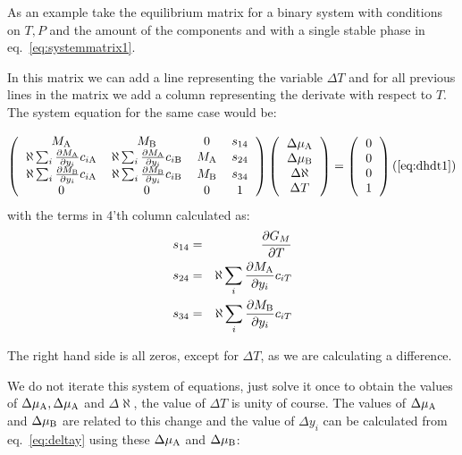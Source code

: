 \documentclass[12pt]{article}
\begin{document}
As an example take the equilibrium matrix for a binary system with
conditions on $T, P$ and the amount of the components and with a
single stable phase in eq.~\ref{eq:systemmatrix1}.

In this matrix we can add a line representing the variable $\Delta T$
and for all previous lines in the matrix we add a column representing
the derivate with respect to $T$.  The system equation for the same
case would be:

\label{eq:dhdt1}

\[
\left(
\begin{tabular}{cccc}
$M_{\rm A}$ & $M_{\rm B}$ & 0 & $s_{14}$ \\
$\aleph \sum_i \frac{\partial M_{\rm A}}{\partial y_i} c_{i{\rm A}}$ &
$\aleph \sum_i \frac{\partial M_{\rm A}}{\partial y_i} c_{i{\rm B}}$ &
$M_{\rm A}$ & $s_{24}$\\
$\aleph \sum_i \frac{\partial M_{\rm B}}{\partial y_i} c_{i{\rm A}}$ &
$\aleph \sum_i \frac{\partial M_{\rm B}}{\partial y_i} c_{i{\rm B}}$ &
$M_{\rm B}$ & $s_{34}$\\
0 & 0 & 0 & 1
\end{tabular}
\right)
\left(
\begin{tabular}{c}
$\Delta\mu_{\rm A}$\\
$\Delta\mu_{\rm B}$\\
$\Delta \aleph$\\
$\Delta T$
\end{tabular}
\right)
=
\left(
\begin{tabular}{c}
0\\
0\\
0\\
1\\
\end{tabular}
\right)
\\ (\ref{eq:dhdt1})
\]
with the terms in 4'th column calculated as:
\begin{eqnarray}
s_{14} &=& \frac{\partial G_M}{\partial T}\\
s_{24} &=& \aleph\sum_i\frac{\partial M_{\rm A}}{\partial y_i}c_{iT}\\
s_{34} &=& \aleph\sum_i\frac{\partial M_{\rm B}}{\partial y_i}c_{iT}
\end{eqnarray}

The right hand side is all zeros, except for $\Delta T$, as we are
calculating a difference.

We do not iterate this system of equations, just solve it once to
obtain the values of $\Delta\mu_{\rm A}, \Delta\mu_{\rm A}$ and
$\Delta \aleph$, the value of $\Delta T$ is unity of course.  The
values of $\Delta\mu_{\rm A}$ and $\Delta\mu_{\rm B}$ are related to
this change and the value of $\Delta y_i$ can be calculated from
eq.~\ref{eq:deltay} using these $\Delta\mu_{\rm A}$ and
$\Delta\mu_{\rm B}$:
\end{document}

